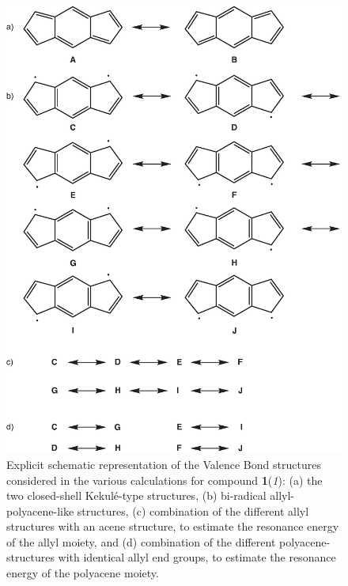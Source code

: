 \begin{figure}[ht]
\center
\includegraphics[scale=0.65]{indacene/figures/scheme1.eps}
\caption{Explicit schematic representation of the Valence Bond structures considered in the various calculations for compound \textbf{1}(\textit{1}): (a) the two closed-shell Kekul\'e-type structures, (b) bi-radical allyl-polyacene-like structures, (c) combination of the different allyl structures with an acene structure, to estimate the resonance energy of the allyl moiety, and (d) combination of the different polyacene-structures with identical allyl end groups, to estimate the resonance energy of the polyacene moiety.}
\label{ch7.fig06}
\end{figure}


